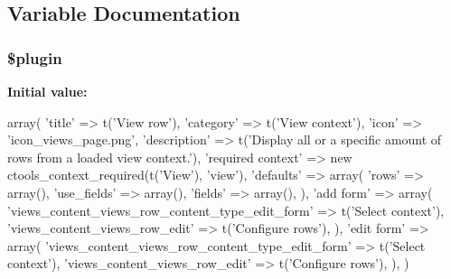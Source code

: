 \subsection{Variable Documentation}
\hypertarget{views__row_8inc_ada8a7130088351710bb02ed622d6bf65}{
\subsubsection[{\$plugin}]{\setlength{\rightskip}{0pt plus 5cm}\$plugin}}
\label{views__row_8inc_ada8a7130088351710bb02ed622d6bf65}
{\bfseries Initial value:}
\begin{DoxyCode}
 array(
  'title' => t('View row'),
  'category' => t('View context'),
  'icon' => 'icon_views_page.png',
  'description' => t('Display all or a specific amount of rows from a loaded view
       context.'),
  'required context' => new ctools_context_required(t('View'), 'view'),
  'defaults' => array(
    'rows' => array(),
    'use_fields' => array(),
    'fields' => array(),
  ),
  'add form' => array(
    'views_content_views_row_content_type_edit_form' => t('Select context'),
    'views_content_views_row_edit' => t('Configure rows'),
  ),
  'edit form' => array(
    'views_content_views_row_content_type_edit_form' => t('Select context'),
    'views_content_views_row_edit' => t('Configure rows'),
  ),
)
\end{DoxyCode}

